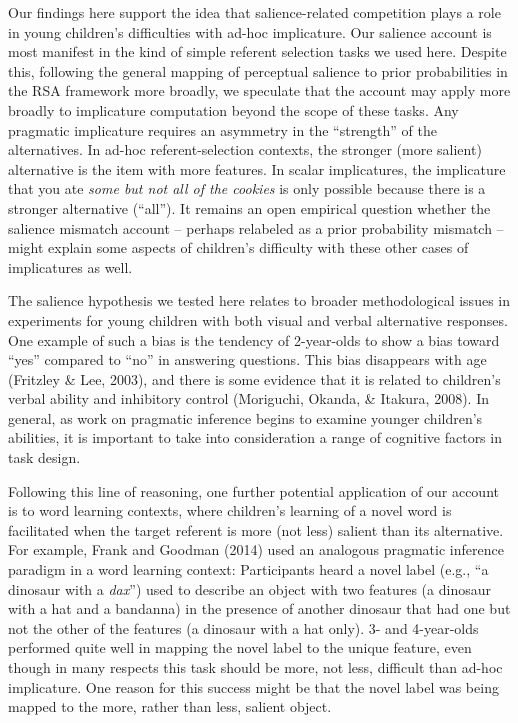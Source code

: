 \documentclass[mask,man]{apa6}
\begin{document}
Our findings here support the idea that salience-related competition
plays a role in young children's difficulties with ad-hoc implicature.
Our salience account is most manifest in the kind of simple referent
selection tasks we used here. Despite this, following the general
mapping of perceptual salience to prior probabilities in the RSA
framework more broadly, we speculate that the account may apply more
broadly to implicature computation beyond the scope of these tasks. Any
pragmatic implicature requires an asymmetry in the \enquote{strength} of
the alternatives. In ad-hoc referent-selection contexts, the stronger
(more salient) alternative is the item with more features. In scalar
implicatures, the implicature that you ate \emph{some but not all of the
cookies} is only possible because there is a stronger alternative
(\enquote{all}). It remains an open empirical question whether the
salience mismatch account -- perhaps relabeled as a prior probability
mismatch -- might explain some aspects of children's difficulty with
these other cases of implicatures as well.

The salience hypothesis we tested here relates to broader methodological
issues in experiments for young children with both visual and verbal
alternative responses. One example of such a bias is the tendency of
2-year-olds to show a bias toward \enquote{yes} compared to \enquote{no}
in answering questions. This bias disappears with age (Fritzley \& Lee,
2003), and there is some evidence that it is related to children's
verbal ability and inhibitory control (Moriguchi, Okanda, \& Itakura,
2008). In general, as work on pragmatic inference begins to examine
younger children's abilities, it is important to take into consideration
a range of cognitive factors in task design.

Following this line of reasoning, one further potential application of
our account is to word learning contexts, where children's learning of a
novel word is facilitated when the target referent is more (not less)
salient than its alternative. For example, Frank and Goodman (2014) used
an analogous pragmatic inference paradigm in a word learning context:
Participants heard a novel label (e.g., \enquote{a dinosaur with a
\emph{dax}}) used to describe an object with two features (a dinosaur
with a hat and a bandanna) in the presence of another dinosaur that had
one but not the other of the features (a dinosaur with a hat only). 3-
and 4-year-olds performed quite well in mapping the novel label to the
unique feature, even though in many respects this task should be more,
not less, difficult than ad-hoc implicature. One reason for this success
might be that the novel label was being mapped to the more, rather than
less, salient object.
\end{document}

